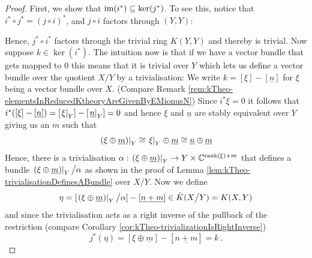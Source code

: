\begin{proof}
	First, we show that $\mathrm{im}(i^*)\subseteq \ker(j^*)$. To see this, notice that $i^*\circ j^*=(j\circ i)^*$, and $j\circ i$ factors through $(Y,Y)$:
	\begin{center}
	\end{center}
	Hence, $j^*\circ i^*$ factors through the trivial ring $K(Y,Y)$ and thereby is trivial.
	Now suppose $k\in \ker(i^*)$. 
	The intuition now is that if we have a vector bundle that gets mapped to $0$ this means that it is trivial over $Y$ which lets us define a vector bundle over the quotient $X\slash Y$ by a trivialisation: 
	We write $k=[\xi]-[\underline{n}]$ for $\xi$ being a vector bundle over $X$. (Compare Remark \ref{rem:kTheo-elementsInReducedKtheoryAreGivenByEMionusN}) Since $i^*\xi=0$ it follows that $i^*([\xi]-[\underline{n}])=[\left.\xi\right|_{Y}]-[\left.\underline{n}\right|_{Y}]=0$ and hence $\xi$ and $\underline{n}$ are stably equivalent over $Y$ giving us an $m$ such that 
	\begin{equation*}
		\left.\left(\xi\oplus \underline{m}\right)\right|_{Y}\cong \left.\xi\right|_{Y}\oplus\underline{m}\cong \underline{n}\oplus \underline{m}
	\end{equation*}
	Hence, there is a trivialisation $\alpha: \left.\left(\xi\oplus \underline{m}\right)\right|_{Y} \to Y\times \mathbb{C}^{\operatorname{\mathrm{rank}}(\xi)+m}$ that defines a bundle $\left.\left(\xi\oplus \underline{m}\right)\right|_{Y} \big/\alpha$ as shown in the proof of Lemma \ref{lem:kTheo-trivialisationDefinesABundle} over $X\big/Y$. Now we define 
	\begin{equation*}
		\eta=[\left.\left(\xi\oplus \underline{m}\right)\right|_{Y} \big/\alpha]-[\underline{n+m}]\in \tilde{K}(X\big/Y)=K(X,Y)
	\end{equation*} and since the trivialisation acts as a right inverse of the pullback of the restriction (compare Corollary \ref{cor:kTheo-trivializationIsRightInverse})
	\begin{equation*}
		j^*(\eta)=[\xi \oplus \underline{m}]-[\underline{n+m}]=k\,.
	\end{equation*} 
\end{proof}


